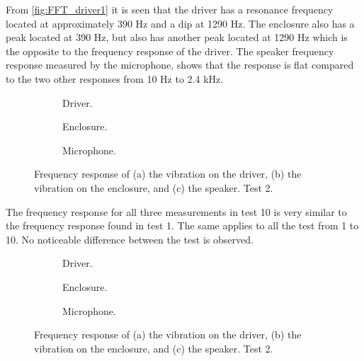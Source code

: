 From \autoref{fig:FFT_driver1} it is seen that the driver has a resonance frequency located at approximately 390 Hz and a dip at 1290 Hz. The enclosure also has a peak located at 390 Hz, but also has another peak located at 1290 Hz which is the opposite to the frequency response of the driver. The speaker frequency response measured by the microphone, shows that the response is flat compared to the two other responses from 10 Hz to 2.4 kHz.

\begin{figure}[H]
\centering
\begin{subfigure}[t]{0.37\textwidth}
	
	\caption{Driver.}
	\label{fig:FFT_driver10}
\end{subfigure}
\begin{subfigure}[t]{0.28\textwidth}
	
	\caption{Enclosure.}
	\label{fig:FFT_enclosure10}
\end{subfigure}
\begin{subfigure}[t]{0.32\textwidth}
	
	\caption{Microphone.}
	\label{fig:FFT_mic10}
\end{subfigure}
\caption{Frequency response of (a) the vibration on the driver, (b) the vibration on the enclosure, and (c) the speaker. Test 2.}
\label{fig:FFT1}
\end{figure}

The frequency response for all three measurements in test 10 is very similar to the frequency response found in test 1. The same applies to all the test from 1 to 10. No noticeable difference between the test is observed.

\begin{figure}[H]
\centering
\begin{subfigure}[t]{0.37\textwidth}
	
	\caption{Driver.}
	\label{fig:FFT_driver10}
\end{subfigure}
\begin{subfigure}[t]{0.28\textwidth}
	
	\caption{Enclosure.}
	\label{fig:FFT_enclosure19}
\end{subfigure}
\begin{subfigure}[t]{0.32\textwidth}
	
	\caption{Microphone.}
	\label{fig:FFT_mic19}
\end{subfigure}
\caption{Frequency response of (a) the vibration on the driver, (b) the vibration on the enclosure, and (c) the speaker. Test 2.}
\label{fig:FFT1}
\end{figure} 


